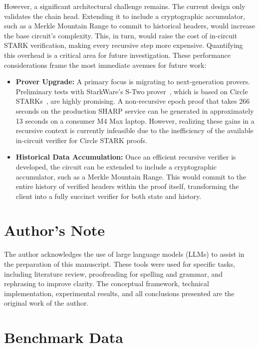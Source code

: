 \documentclass[runningheads]{llncs}
\begin{document}
However, a significant architectural challenge remains. The current design only validates the chain head. Extending it to include a cryptographic accumulator, such as a Merkle Mountain Range to commit to historical headers, would increase the base circuit's complexity. This, in turn, would raise the cost of in-circuit STARK verification, making every recursive step more expensive. Quantifying this overhead is a critical area for future investigation. These performance considerations frame the most immediate avenues for future work:

\begin{itemize}
    \item \textbf{Prover Upgrade:} A primary focus is migrating to next-generation provers. Preliminary tests with StarkWare's S-Two prover~\cite{StarkWare2025STwo}, which is based on Circle STARKs~\cite{Habock2024CircleSTARKs}, are highly promising. A non-recursive epoch proof that takes 266 seconds on the production SHARP service can be generated in approximately 13 seconds on a consumer M4 Max laptop. However, realizing these gains in a recursive context is currently infeasible due to the inefficiency of the available in-circuit verifier for Circle STARK proofs.
    
    \item \textbf{Historical Data Accumulation:} Once an efficient recursive verifier is developed, the circuit can be extended to include a cryptographic accumulator, such as a Merkle Mountain Range. This would commit to the entire history of verified headers within the proof itself, transforming the client into a fully succinct verifier for both state and history.
\end{itemize}

\section*{Author's Note}
The author acknowledges the use of large language models (LLMs) to assist in the preparation of this manuscript. These tools were used for specific tasks, including literature review, proofreading for spelling and grammar, and rephrasing to improve clarity. The conceptual framework, technical implementation, experimental results, and all conclusions presented are the original work of the author.


\appendix
\section{Benchmark Data}
\label{sec:appendix_benchmark}
\end{document}
